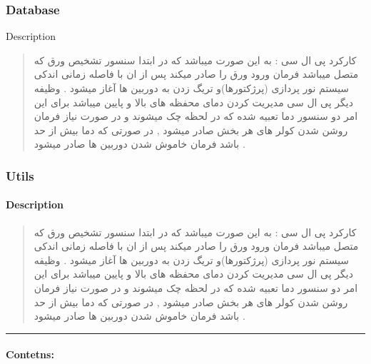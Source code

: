 \documentclass[letterpaper,10pt,english]{sphinxmanual}
\begin{document}
\sphinxstepscope


\subsubsection{Database}
\label{\detokenize{setting/database Dir:database}}\label{\detokenize{setting/database Dir::doc}}
\sphinxAtStartPar
Description
\begin{quote}

\sphinxAtStartPar
کارکرد پی ال سی : به این صورت میباشد که در ابتدا سنسور تشخیص ورق که متصل میباشد فرمان ورود ورق را صادر میکند پس از ان با فاصله زمانی اندکی سیستم نور پردازی (پرژکتورها)و تریگ زدن به دوربین ها آغاز میشود . وظیفه دیگر پی ال سی مدیریت کردن دمای محفظه های بالا و پایین میباشد برای این امر دو سنسور دما تعبیه شده که در لحظه چک میشوند و در صورت نیاز فرمان روشن شدن کولر های هر بخش صادر میشود , در صورتی که دما بیش از حد باشد فرمان خاموش شدن دوربین ها صادر میشود .
\end{quote}

\sphinxstepscope


\subsubsection{Utils}
\label{\detokenize{setting/utils Dir:utils}}\label{\detokenize{setting/utils Dir::doc}}

\paragraph{Description}
\label{\detokenize{setting/utils Dir:description}}\begin{quote}

\sphinxAtStartPar
کارکرد پی ال سی : به این صورت میباشد که در ابتدا سنسور تشخیص ورق که متصل میباشد فرمان ورود ورق را صادر میکند پس از ان با فاصله زمانی اندکی سیستم نور پردازی (پرژکتورها)و تریگ زدن به دوربین ها آغاز میشود . وظیفه دیگر پی ال سی مدیریت کردن دمای محفظه های بالا و پایین میباشد برای این امر دو سنسور دما تعبیه شده که در لحظه چک میشوند و در صورت نیاز فرمان روشن شدن کولر های هر بخش صادر میشود , در صورتی که دما بیش از حد باشد فرمان خاموش شدن دوربین ها صادر میشود .
\end{quote}


\bigskip\hrule\bigskip



\paragraph{Contetns:}
\label{\detokenize{setting/utils Dir:contetns}}
\sphinxstepscope
\end{document}
